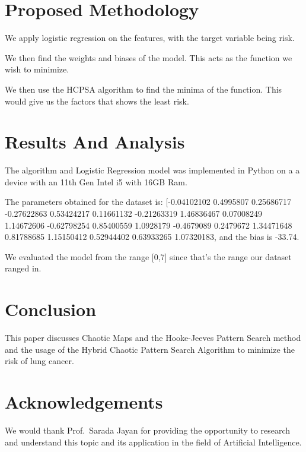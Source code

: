 \documentclass[conference]{IEEEtran}
\begin{document}
\section{Proposed Methodology}

We apply logistic regression on the features, with the target variable being risk.

We then find the weights and biases of the model. This acts as the function we wish to minimize.

We then use the HCPSA algorithm to find the minima of the function. This would give us the factors that shows the least risk.

\section{Results And Analysis}
The algorithm and Logistic Regression model was implemented in Python on a a device with an 11th Gen Intel i5 with 16GB Ram.

The parameters obtained for the dataset is: [-0.04102102  0.4995807   0.25686717 -0.27622863  0.53424217  0.11661132  -0.21263319  1.46836467  0.07008249  1.14672606 -0.62798254  0.85400559   1.0928179  -0.4679089   0.2479672   1.34471648  0.81788685  1.15150412   0.52944402  0.63933265  1.07320183, and the bias is -33.74.

We evaluated the model from the range [0,7] since that's the range our dataset ranged in.


\section{Conclusion}
This paper discusses Chaotic Maps and the Hooke-Jeeves Pattern Search method and the usage of the Hybrid Chaotic Pattern Search Algorithm to minimize the risk of lung cancer.

\section{Acknowledgements}
We would thank Prof.\ Sarada Jayan for providing the opportunity to research and understand this topic and its application in the field of Artificial Intelligence.


\vspace{12pt}
\end{document}
